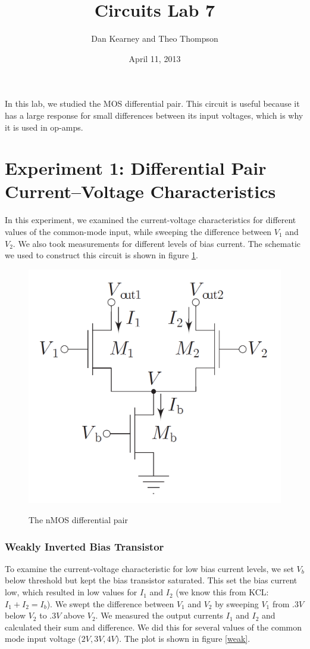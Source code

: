 \documentclass{article}
\title{Circuits Lab 7}
\author{Dan Kearney and Theo Thompson}
\date{April 11, 2013}
\begin{document}
\maketitle
In this lab, we studied the MOS differential pair. This circuit is useful because it has a large response for small differences between its input voltages, which is why it is used in op-amps.
\section*{Experiment 1: Differential Pair Current–Voltage Characteristics}
In this experiment, we examined the current-voltage characteristics for different values of the common-mode input, while sweeping the difference between $V_1$ and $V_2$. We also took measurements for different levels of bias current. The schematic we used to construct this circuit is shown in figure \ref{schem}. 
\begin{figure}[H]
\centering
\includegraphics[scale=.3]{diffSchem.png}
\label{schem}
\caption{The nMOS differential pair}
\end{figure}

\subsubsection*{Weakly Inverted Bias Transistor}
To examine the current-voltage characteristic for low bias current levels, we set $V_b$ below threshold but kept the bias transistor saturated. This set the bias current low, which resulted in low values for $I_1$ and $I_2$ (we know this from KCL: $I_1+I_2=I_b$). We swept the difference between $V_1$ and $V_2$ by sweeping $V_1$ from $.3V$ below $V_2$ to $.3V$ above $V_2$. We measured the output currents $I_1$ and $I_2$ and calculated their sum and difference. We did this for several values of the common mode input voltage ($2V,3V,4V$). The plot is shown in figure \ref{weak}.\\
\end{document}
